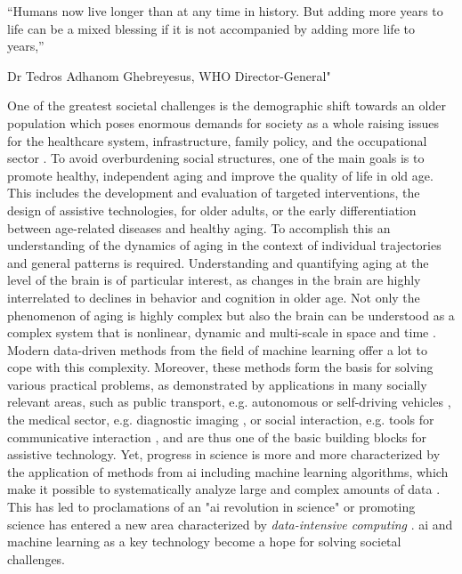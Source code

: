 \setlength{\epigraphwidth}{0.6\textwidth}
\epigraph{\centering “Humans now live longer than at any time in history. But adding more years to life can be a mixed blessing if it is not accompanied by adding more life to years,”} {Dr Tedros Adhanom Ghebreyesus, WHO Director-General"}

One of the greatest societal challenges is the demographic shift towards an older population which poses enormous demands for society as a whole raising issues for the healthcare system, infrastructure, family policy, and the occupational sector \cite{who_aging2023}. To avoid overburdening social structures, one of the main goals is to promote healthy, independent aging and improve the quality of life in old age. This includes the development and evaluation of targeted interventions, the design of assistive technologies, for older adults, or the early differentiation between age-related diseases and healthy aging. To accomplish this an understanding of the dynamics of aging in the context of individual trajectories and general patterns is required. Understanding and quantifying aging at the level of the brain is of particular interest, as changes in the brain are highly interrelated to declines in behavior and cognition in older age. Not only the phenomenon of aging is highly complex but also the brain can be understood as a complex system that is nonlinear, dynamic and multi-scale in space and time \cite{Betzel2017}.\\ 
Modern data-driven methods from the field of machine learning offer a lot to cope with this complexity. Moreover, these methods form the basis for solving various practical problems, as demonstrated by applications in many socially relevant areas, such as public transport, e.g. autonomous or self-driving vehicles \cite{Leonard2020}, the medical sector, e.g. diagnostic imaging \cite{Liu2020}, or social interaction, e.g. tools for communicative interaction \cite{Adamopoulou2020}, and are thus one of the basic building blocks for assistive technology. Yet, progress in science is more and more characterized by the application of methods from \gls{ai} including machine learning algorithms, which make it possible to systematically analyze large and complex amounts of data \cite{Brunton2019}. This has led to proclamations of an "\gls{ai} revolution in science" \cite{Appenzeller2017} or promoting science has entered a new area characterized by \textit{data-intensive computing} \cite{Hey2009}. \Gls{ai} and machine learning as a key technology become a hope for solving societal challenges.\\ 
